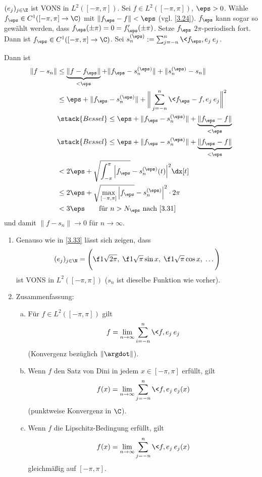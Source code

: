 \begin{st} \label{3.33}
	$(e_j)_{j\in \Z}$ ist VONS in $L^2([-\pi,\pi])$.
	Sei $f \in L^2([-\pi,\pi])$, $\eps > 0$. 
	Wähle $f_\eps \in C^1([-\pi,\pi] \to \C)$ mit $\|f_\eps - f\| < \eps$ (vgl. \ref{3.24}).
	$f_\eps$ kann sogar so gewählt werden, dass $f_\eps(\pm\pi) = 0 = f_\eps'(\pm \pi)$.
	Setze $f_\eps$ $2\pi$-periodisch fort. 
	Dann ist $f_\eps \in C^1([-\pi,\pi] \to \C)$.
	Sei $s_n^{(\eps)} := \sum_{j=-n}^n \<f_\eps, e_j\> e_j$. 

	Dann ist
	\begin{align*}
		\|f - s_n\| 
		&\le \underbrace{\|f - f_\eps\|}_{<\eps} + \|f_\eps - s_n^{(\eps)}\| + \|s_n^{(\eps)} - s_n\| \\
		&\le \eps + \|f_\eps - s_n^{(\eps)}\| + \bigg\| \sum_{j=-n}^n \<f_\eps - f, e_j\> e_j \bigg\|^2 \\
		&\stack{Bessel}\le \eps + \|f_\eps - s_n^{(\eps)}\| + \underbrace{\|f_\eps - f\|}_{<\eps} \\
		&\stack{Bessel}\le \eps + \|f_\eps - s_n^{(\eps)}\| + \underbrace{\|f_\eps - f\|}_{<\eps} \\
		&< 2\eps + \sqrt{\int_{-\pi}^\pi \Big|f_\eps} - s_n^{(\eps)}(t)\Big|^2 \dx[t] \\
		&\le 2\eps + \sqrt{\max_{[-\pi,\pi]} \Big|f_\eps} - s_n^{(\eps)}\Big|^2 \cdot 2\pi \\
		&< 3\eps  \qquad \text{für $n > N_\eps$ nach \ref{3.31}} \\
	\end{align*}
	und damit $\|f - s_n\| \to 0$ für $n \to \infty$.
\end{st}

\begin{nt} \label{3.34}
	\begin{enumerate}[1)]
		\item
			Genauso wie in \ref{3.33} lässt sich zeigen, dass
			\[
				(e_j)_{j\in \N} = \Bigg( \f 1{\sqrt{2\pi}}, \; \f 1{\sqrt{\pi}} \sin x,\; \f 1{\sqrt{\pi}} \cos x,\; \dotsc \Bigg)
			\]
			ist VONS in $L^2([-\pi,\pi])$ ($s_n$ ist dieselbe Funktion wie vorher).
		\item
			Zusammenfassung:
			\begin{enumerate}[a)]
				\item
					Für $f \in L^2([-\pi,\pi])$ gilt
					\[
						f = \lim_{n\to \infty} \sum_{i=-n}^n \<f,e_j\> e_j
					\]
					(Konvergenz bezüglich $\|\argdot\|$).
				\item
					Wenn $f$ den Satz von Dini in jedem $x\in [-\pi,\pi]$ erfüllt, gilt
					\[
						f(x) = \lim_{n\to \infty} \sum_{j=-n}^n \<f,e_j\> e_j(x)
					\]
					(punktweise Konvergenz in $\C$).
				\item
					Wenn $f$ die Lipschitz-Bedingung erfüllt, gilt
					\[
						f(x) = \lim_{n\to\infty} \sum_{j=-n}^n \<f,e_j\> e_j(x)
					\]
					gleichmäßig auf $[-\pi,\pi]$.
			\end{enumerate}
	\end{enumerate}
\end{nt}

